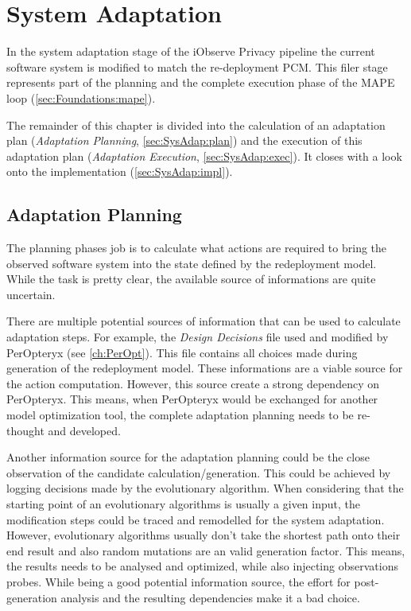 \chapter{System Adaptation}
\label{ch:SysAdap}

In the system adaptation stage of the iObserve Privacy pipeline the current software system is modified to match the re-deployment PCM. This filer stage represents part of the planning and the complete execution phase of the MAPE loop (\autoref{sec:Foundations:mape}).

The remainder of this chapter is divided into the calculation of an adaptation plan (\textit{Adaptation Planning}, \autoref{sec:SysAdap:plan}) and the execution of this adaptation plan (\textit{Adaptation Execution}, \autoref{sec:SysAdap:exec}). It closes with a look onto the implementation (\autoref{sec:SysAdap:impl}).


\section{Adaptation Planning}
\label{sec:SysAdap:plan}

The planning phases job is to calculate what actions are required to bring the observed software system into the state defined by the redeployment model. While the task is pretty clear, the available source of informations are quite uncertain.

There are multiple potential sources of information that can be used to calculate adaptation steps. For example, the \textit{Design Decisions} file used and modified by PerOpteryx (see \autoref{ch:PerOpt}). This file contains all choices made during generation of the redeployment model. These informations are a viable source for the action computation. However, this source create a strong dependency on PerOpteryx. This means, when PerOpteryx would be exchanged for another model optimization tool, the complete adaptation planning needs to be re-thought and developed.

Another information source for the adaptation planning could be the close observation of the candidate calculation/generation. This could be achieved by logging decisions made by the evolutionary algorithm. When considering that the starting point of an evolutionary algorithms is usually a given input, the modification steps could be traced and remodelled for the system adaptation. However, evolutionary algorithms usually don't take the shortest path onto their end result and also random mutations are an valid generation factor. This means, the results needs to be analysed and optimized, while also injecting observations probes. While being a good potential information source, the effort for post-generation analysis and the resulting dependencies make it a bad choice.


